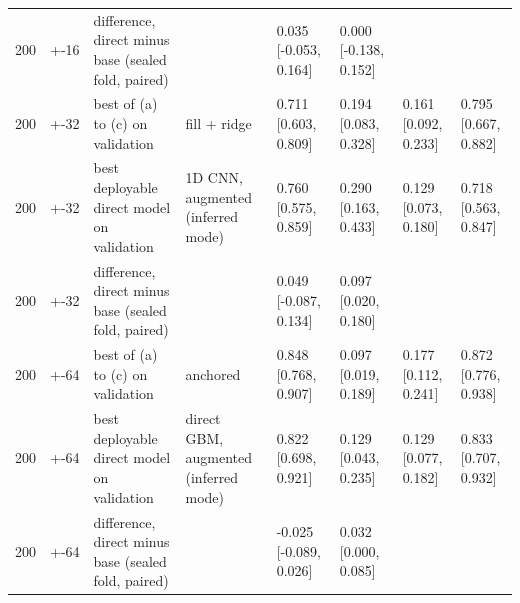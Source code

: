 \begin{tabular}{rlllllll}
200 & +-16 & difference, direct minus base (sealed fold, paired) &  & 0.035 [-0.053, 0.164] & 0.000 [-0.138, 0.152] &  &  \\
200 & +-32 & best of (a) to (c) on validation & fill + ridge & 0.711 [0.603, 0.809] & 0.194 [0.083, 0.328] & 0.161 [0.092, 0.233] & 0.795 [0.667, 0.882] \\
200 & +-32 & best deployable direct model on validation & 1D CNN, augmented (inferred mode) & 0.760 [0.575, 0.859] & 0.290 [0.163, 0.433] & 0.129 [0.073, 0.180] & 0.718 [0.563, 0.847] \\
200 & +-32 & difference, direct minus base (sealed fold, paired) &  & 0.049 [-0.087, 0.134] & 0.097 [0.020, 0.180] &  &  \\
200 & +-64 & best of (a) to (c) on validation & anchored & 0.848 [0.768, 0.907] & 0.097 [0.019, 0.189] & 0.177 [0.112, 0.241] & 0.872 [0.776, 0.938] \\
200 & +-64 & best deployable direct model on validation & direct GBM, augmented (inferred mode) & 0.822 [0.698, 0.921] & 0.129 [0.043, 0.235] & 0.129 [0.077, 0.182] & 0.833 [0.707, 0.932] \\
200 & +-64 & difference, direct minus base (sealed fold, paired) &  & -0.025 [-0.089, 0.026] & 0.032 [0.000, 0.085] &  &  \\
\bottomrule
\end{tabular}
